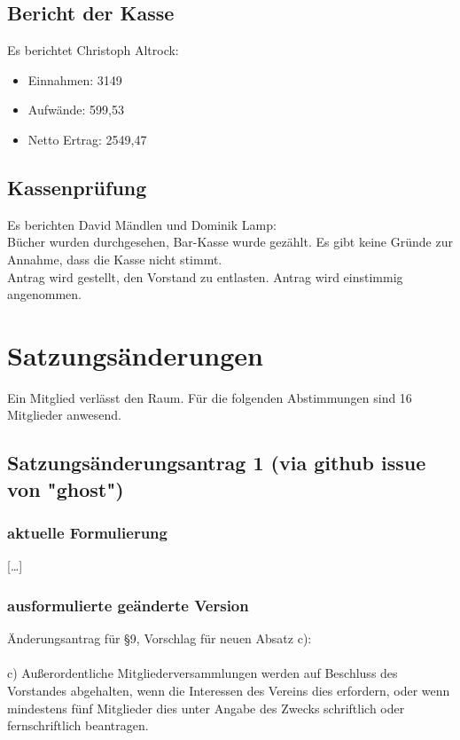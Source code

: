 \documentclass[a4paper]{scrartcl}
\begin{document}
\subsection{Bericht der Kasse}
Es berichtet Christoph Altrock:\\
\begin{itemize}
\item Einnahmen: 3149 \texteuro
\item Aufwände: 599,53 \texteuro
\item Netto Ertrag: 2549,47 \texteuro
\end{itemize}
\subsection{Kassenprüfung}
Es berichten David Mändlen und Dominik Lamp:\\
Bücher wurden durchgesehen, Bar-Kasse wurde gezählt. Es gibt keine Gründe zur Annahme, dass die Kasse nicht stimmt.\\
Antrag wird gestellt, den Vorstand zu entlasten. Antrag wird einstimmig angenommen.

\section{Satzungsänderungen}
Ein Mitglied verlässt den Raum. Für die folgenden Abstimmungen sind 16 Mitglieder anwesend.

\subsection{Satzungsänderungsantrag 1 (via github issue von "ghost")}
\subsubsection{aktuelle Formulierung}

{[}\dots{]}\\

\subsubsection{ausformulierte geänderte Version}

Änderungsantrag für §9, Vorschlag für neuen Absatz c):\\
\\
c) Außerordentliche Mitgliederversammlungen werden auf Beschluss des Vorstandes abgehalten, wenn die Interessen des Vereins dies erfordern, oder wenn mindestens fünf Mitglieder dies unter Angabe des Zwecks schriftlich oder fernschriftlich beantragen.
\end{document}
